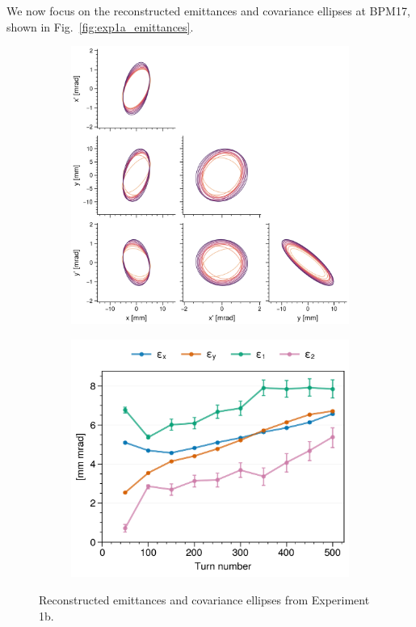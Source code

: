 We now focus on the reconstructed emittances and covariance ellipses at BPM17, shown in Fig.~\ref{fig:exp1a_emittances}.
%
\begin{figure}[!p]
    \centering
    \begin{subfigure}{0.6\textwidth}
        \includegraphics[width=\textwidth]{Images/chapter5/exp1b/corner.png}
    \end{subfigure}
    \hfill
    \begin{subfigure}[t]{0.39\textwidth}
        \includegraphics[width=\textwidth]{Images/chapter5/exp1b/emittances.png}
    \end{subfigure}
    \caption{Reconstructed emittances and covariance ellipses from Experiment 1b.}
    \label{fig:exp1b_emittances}
\end{figure}
